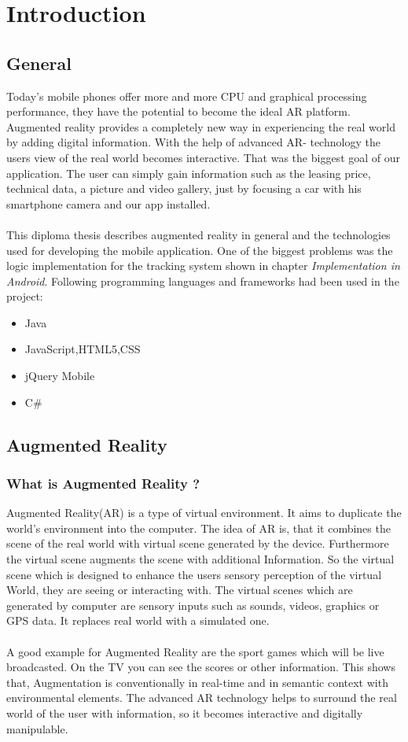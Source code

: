 \chapter{Introduction}  \label{chapter:intro}
\section{General}
Today's mobile phones offer more and more CPU and graphical processing performance, they have the potential to become the ideal AR platform. Augmented reality provides a completely new way in experiencing the real world by adding digital information. With the help of advanced AR- technology the users view of the real world becomes interactive. That was the biggest goal of our application. The user can simply gain information such as the leasing price, technical data, a picture and video gallery, just by focusing a car with his smartphone camera and our app installed.  
    \\\\
 This diploma thesis describes augmented reality in general and the technologies used for developing the mobile application. One of the biggest problems was the logic implementation for the tracking system shown in chapter \textit{Implementation in Android}. Following programming languages and frameworks had been used in the project:     
 \begin{itemize}
 \item Java
\item JavaScript,HTML5,CSS
 \item jQuery Mobile
 \item C\#
 \end{itemize}
 \newpage
 \section{Augmented Reality}
 \subsection{What is Augmented Reality ?}
  Augmented Reality(AR) is a type of  virtual environment. It aims to duplicate the world's environment into the computer. The idea of AR is, that it combines the scene of the real world with virtual scene generated by the device. Furthermore the virtual scene augments the scene with additional Information. So the virtual scene which is designed to enhance the users sensory perception of the virtual World, they are seeing or interacting with. The virtual scenes which are generated by computer are sensory inputs such as sounds, videos, graphics or GPS data. It replaces real world with a simulated one.\cite{augmenteddef}
 \\\\
 A good example for Augmented Reality are the sport games which will be live broadcasted. On the TV you can see the scores or other information. This shows that,  Augmentation is conventionally in real-time and in semantic context with environmental elements. The advanced AR technology helps to surround the real world of the user with information, so it becomes interactive and digitally manipulable.\cite{augmenteddef}
 \\
